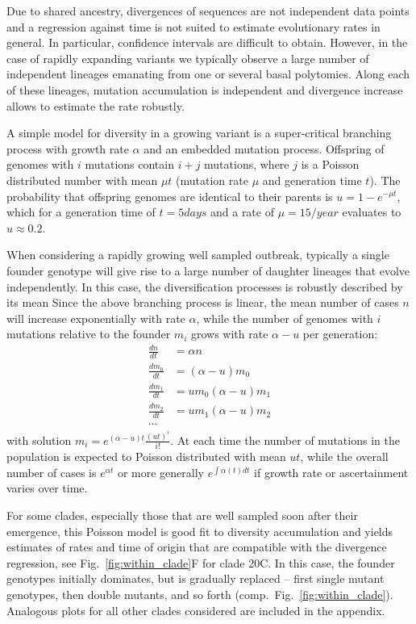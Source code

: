 \documentclass[aps,rmp, twocolumn]{revtex4}
\begin{document}
Due to shared ancestry, divergences of sequences are not independent data points and a regression against time is not suited to estimate evolutionary rates in general.
In particular, confidence intervals are difficult to obtain.
However, in the case of rapidly expanding variants we typically observe a large number of independent lineages emanating from one or several basal polytomies.
Along each of these lineages, mutation accumulation is independent and divergence increase allows to estimate the rate robustly.

A simple model for diversity in a growing variant is a super-critical branching process with growth rate $\alpha$ and an embedded mutation process.
Offspring of genomes with $i$ mutations contain $i+j$ mutations, where $j$ is a Poisson distributed number with mean $\mu t$ (mutation rate $\mu$ and generation time $t$).
The probability that offspring genomes are identical to their parents is $u = 1-e^{-\mu t}$, which for a generation time of $t=5days$ and a rate of $\mu = 15/year$ evaluates to $u\approx 0.2$.

When considering a rapidly growing well sampled outbreak, typically a single founder genotype will give rise to a large number of daughter lineages that evolve independently.
In this case, the diversification processes is robustly described by its mean
Since the above branching process is linear, the mean number of cases $n$ will increase exponentially with rate $\alpha$, while the number of genomes with $i$ mutations relative to the founder $m_i$ grows with rate $\alpha - u$ per generation:
\begin{equation}
    \begin{split}
        \frac{dn}{dt} &= \alpha n \\
        \frac{dm_0}{dt} &= (\alpha - u) m_0 \\
        \frac{dm_1}{dt} &= u m_0 (\alpha - u) m_1 \\
        \frac{dm_2}{dt} &= u m_1 (\alpha - u) m_2 \\
        \cdots
    \end{split}
\end{equation}
with solution $m_i = e^{(\alpha - u)t} \frac{(ut)^i}{i!}$.
At each time the number of mutations in the population is expected to Poisson distributed with mean $ut$, while the overall number of cases is $e^{\alpha t}$ or more generally $e^{\int \alpha(t) dt}$ if growth rate or ascertainment varies over time.

For some clades, especially those that are well sampled soon after their emergence, this Poisson model is good fit to diversity accumulation and yields estimates of rates and time of origin that are compatible with the divergence regression, see Fig.~\ref{fig:within_clade}F for clade 20C.
In this case, the founder genotypes initially dominates, but is gradually replaced -- first single mutant genotypes, then double mutants, and so forth (comp.~Fig.~\ref{fig:within_clade}).
Analogous plots for all other clades considered are included in the appendix.
\end{document}
